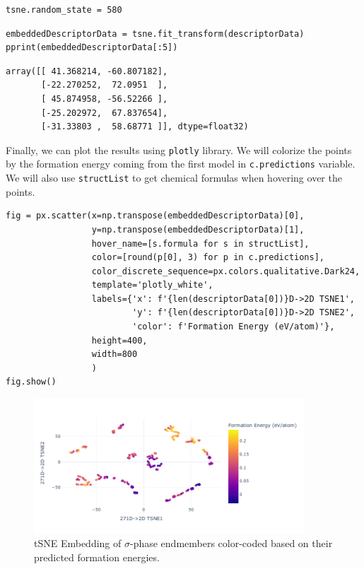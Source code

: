 \begin{verbatim}
tsne.random_state = 580
\end{verbatim}

\begin{verbatim}
embeddedDescriptorData = tsne.fit_transform(descriptorData)
pprint(embeddedDescriptorData[:5])
\end{verbatim}

\begin{verbatim}
array([[ 41.368214, -60.807182],
       [-22.270252,  72.0951  ],
       [ 45.874958, -56.52266 ],
       [-25.202972,  67.837654],
       [-31.33803 ,  58.68771 ]], dtype=float32)
\end{verbatim}

Finally, we can plot the results using \texttt{plotly}
library. We will colorize the points by the formation energy coming from
the first model in \texttt{c.predictions} variable. We
will also use \texttt{structList} to get chemical
formulas when hovering over the points.

\begin{verbatim}
fig = px.scatter(x=np.transpose(embeddedDescriptorData)[0],
                 y=np.transpose(embeddedDescriptorData)[1],
                 hover_name=[s.formula for s in structList],
                 color=[round(p[0], 3) for p in c.predictions],
                 color_discrete_sequence=px.colors.qualitative.Dark24,
                 template='plotly_white',
                 labels={'x': f'{len(descriptorData[0])}D->2D TSNE1',
                         'y': f'{len(descriptorData[0])}D->2D TSNE2',
                         'color': f'Formation Energy (eV/atom)'},
                 height=400,
                 width=800
                 )
fig.show()
\end{verbatim}

\begin{figure}
    \centering
    \includegraphics[width=0.9\textwidth]{pysipfennTutorial2/Lecture2_55_0.png}
    \caption{tSNE Embedding of $\sigma$-phase endmembers color-coded based on their predicted formation energies.}
    \label{pysipfenntutorial2:tsnefig1}
\end{figure}

